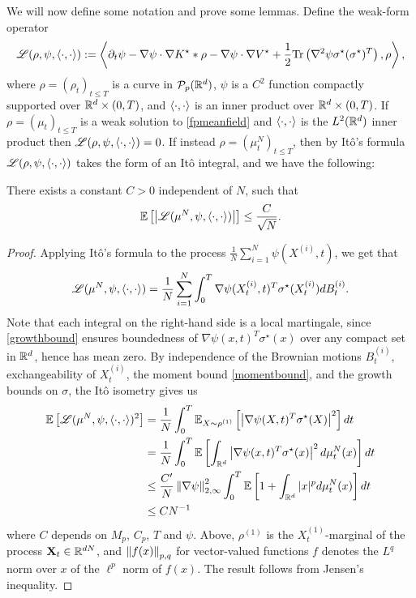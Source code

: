 \documentclass[english,reqno]{amsart}
\begin{document}
 We will now define some notation and prove some lemmas. Define the weak-form operator
\begin{equation}
\mathscr{L}(\rho,\psi,\left\langle\cdot, \cdot\right\rangle):= \left\langle \partial_t\psi - \nabla \psi \cdot \nabla K^\star*\rho - \nabla \psi \cdot\nabla V^\star + \frac{1}{2}\text{Tr}\left(\nabla^2 \psi \sigma^\star(\sigma^\star)^T\right), \rho\right\rangle, 
\end{equation}
where $\rho=(\rho_t)_{t\leq T}$ is a curve in ${\mathcal{P}}_p(\mathbb{R}^d)$, $\psi$ is a $C^2$ function compactly supported over $\mathbb{R}^d\times (0,T)$, and $\left\langle \cdot, \cdot\right\rangle$ is an inner product over $\mathbb{R}^d\times (0,T)$. If $\rho = (\mu_t)_{t\leq T}$ is a weak solution to \eqref{fpmeanfield} and $\left\langle\cdot,\cdot\right\rangle$ is the $L^2(\mathbb{R}^d)$ inner product then $\mathscr{L}(\rho,\psi,\left\langle\cdot, \cdot\right\rangle)=0$. If instead $\rho=(\mu^N_t)_{t\leq T}$, then by It\^o's formula $\mathscr{L}(\rho,\psi,\left\langle\cdot, \cdot\right\rangle)$ takes the form of an It\^o integral, and we have the following:
\begin{lemm}\label{itobound}
There exists a constant $C>0$ independent of $N$, such that
\[\mathbb{E}\left[\left\vert\mathscr{L}(\mu^N,\psi, \left\langle \cdot,\cdot\right\rangle)\right\vert\right]\leq \frac{C}{\sqrt{N}}.\]
\end{lemm}
\begin{proof}
Applying It\^o's formula to the process $\frac{1}{N}\sum_{i=1}^N\psi(X^{(i)},t)$, we get that
\[\mathscr{L}(\mu^N,\psi, \left\langle \cdot,\cdot\right\rangle) = \frac{1}{N}\sum_{i=1}^N\int_0^T\nabla \psi(X^{(i)}_t,t)^T\sigma^\star(X^{(i)}_t) dB^{(i)}_t.\]
Note that each integral on the right-hand side is a local martingale, since \eqref{growthbound} ensures boundedness of $\nabla \psi(x,t)^T\sigma^\star(x)$ over any compact set in $\mathbb{R}^d$, hence has mean zero. By independence of the Brownian motions $B^{(i)}_t$, exchangeability of $X^{(i)}_t$, the moment bound \eqref{momentbound}, and the growth bounds on $\sigma$, the It\^o isometry gives us
\begin{align*}
\mathbb{E}\left[\mathscr{L}(\mu^N,\psi, \left\langle \cdot,\cdot\right\rangle)^2 \right] &= \frac{1}{N}\int_0^T\mathbb{E}_{X\sim \rho^{(1)}}\left[\left\vert\nabla \psi(X,t)^T\sigma^\star(X)\right\vert^2\right] dt \\
&=\frac{1}{N}\int_0^T\mathbb{E}\left[\int_{\mathbb{R}^d} \left\vert\nabla \psi(x,t)^T\sigma^\star(x)\right\vert^2 d\mu^N_t(x)\right] dt \\
&\leq \frac{C'}{N}\left\Vert {\nabla\psi} \right\Vert^2_{2,\infty}\int_0^T\mathbb{E}\left[1+\int_{\mathbb{R}^d}|x|^pd\mu^N_t(x)\right]dt\\
&\leq CN^{-1}
\end{align*}
where $C$ depends on $M_p$, $C_p$, $T$ and $\psi$. 
Above, $\rho^{(1)}$ is the $X^{(1)}_t$-marginal of the process $\mathbf{X}_t\in \mathbb{R}^{dN}$, and $\left\Vert {f(x)} \right\Vert_{p,q}$ for vector-valued functions $f$ denotes the $L^q$ norm over $x$ of the $\ell^p$ norm of $f(x)$. The result follows from Jensen's inequality.
\end{proof}
\end{document}
